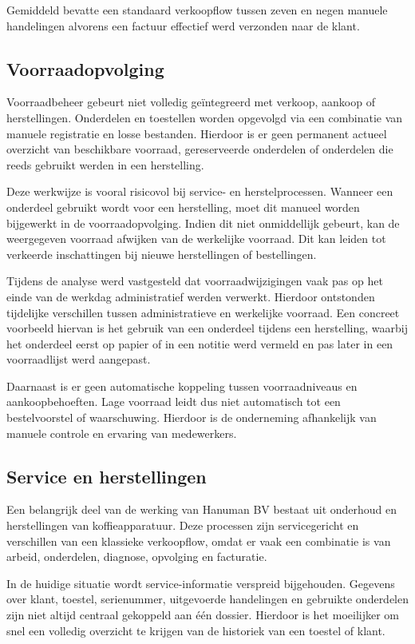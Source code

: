 Gemiddeld bevatte een standaard verkoopflow tussen zeven en negen manuele handelingen alvorens een factuur effectief werd verzonden naar de klant.

\subsection{Voorraadopvolging}

Voorraadbeheer gebeurt niet volledig geïntegreerd met verkoop, aankoop of herstellingen. Onderdelen en toestellen worden opgevolgd via een combinatie van manuele registratie en losse bestanden. Hierdoor is er geen permanent actueel overzicht van beschikbare voorraad, gereserveerde onderdelen of onderdelen die reeds gebruikt werden in een herstelling.

Deze werkwijze is vooral risicovol bij service- en herstelprocessen. Wanneer een onderdeel gebruikt wordt voor een herstelling, moet dit manueel worden bijgewerkt in de voorraadopvolging. Indien dit niet onmiddellijk gebeurt, kan de weergegeven voorraad afwijken van de werkelijke voorraad. Dit kan leiden tot verkeerde inschattingen bij nieuwe herstellingen of bestellingen.

Tijdens de analyse werd vastgesteld dat voorraadwijzigingen vaak pas op het einde van de werkdag administratief werden verwerkt. Hierdoor ontstonden tijdelijke verschillen tussen administratieve en werkelijke voorraad. Een concreet voorbeeld hiervan is het gebruik van een onderdeel tijdens een herstelling, waarbij het onderdeel eerst op papier of in een notitie werd vermeld en pas later in een voorraadlijst werd aangepast.

Daarnaast is er geen automatische koppeling tussen voorraadniveaus en aankoopbehoeften. Lage voorraad leidt dus niet automatisch tot een bestelvoorstel of waarschuwing. Hierdoor is de onderneming afhankelijk van manuele controle en ervaring van medewerkers.

\subsection{Service en herstellingen}

Een belangrijk deel van de werking van Hanuman BV bestaat uit onderhoud en herstellingen van koffieapparatuur. Deze processen zijn servicegericht en verschillen van een klassieke verkoopflow, omdat er vaak een combinatie is van arbeid, onderdelen, diagnose, opvolging en facturatie.

In de huidige situatie wordt service-informatie verspreid bijgehouden. Gegevens over klant, toestel, serienummer, uitgevoerde handelingen en gebruikte onderdelen zijn niet altijd centraal gekoppeld aan één dossier. Hierdoor is het moeilijker om snel een volledig overzicht te krijgen van de historiek van een toestel of klant.

